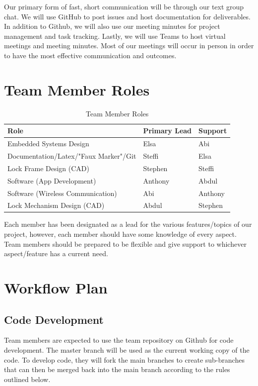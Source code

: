 \documentclass{article}
\begin{document}
Our primary form of fast, short communication will be through our text group chat. We will use GitHub to post issues and host documentation for deliverables.  In addition to Github, we will also use our meeting minutes for project management and task tracking.  Lastly, we will use Teams to host virtual meetings and meeting minutes. Most of our meetings will occur in person in order to have the most effective communication and outcomes. 

\section{Team Member Roles}

\begin{table}[h]
\caption{Team Member Roles} \label{TblTeamMemberRoles}
\begin{tabularx}{\textwidth}{llX}
\toprule
\textbf{Role} & \textbf{Primary Lead} & \textbf{Support}\\
\midrule
Embedded Systems Design & Elsa & Abi\\
Documentation/Latex/"Faux Marker"/Git & Steffi & Elsa\\
Lock Frame Design (CAD) & Stephen & Steffi\\
Software (App Development) & Anthony & Abdul\\
Software (Wireless Communication) & Abi & Anthony\\
Lock Mechanism Design (CAD) & Abdul & Stephen\\
\bottomrule
\end{tabularx}
\end{table}

Each member has been designated as a lead for the various features/topics of our project, however, each member should have some knowledge of every aspect.  Team members should be prepared to be flexible and give support to whichever aspect/feature has a current need. 

\section{Workflow Plan}

\subsection{Code Development}

Team members are expected to use the team repository on Github for code development. The master branch will be used as the current working copy of the code. To develop code, they will fork the main branches to create sub-branches that can then be merged back into the main branch according to the rules outlined below. 
\end{document}
